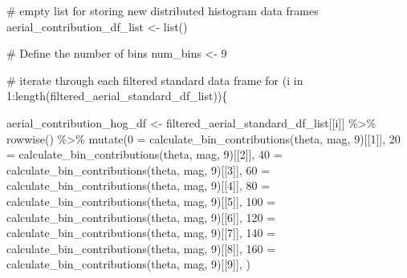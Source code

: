 \documentclass[
  letterpaper,
  DIV=11,
  numbers=noendperiod]{scrreprt}
\newenvironment{Shaded}{\begin{snugshade}}{\end{snugshade}}
\newcommand{\AttributeTok}[1]{\textcolor[rgb]{0.40,0.45,0.13}{#1}}
\newcommand{\CommentTok}[1]{\textcolor[rgb]{0.37,0.37,0.37}{#1}}
\newcommand{\ControlFlowTok}[1]{\textcolor[rgb]{0.00,0.23,0.31}{#1}}
\newcommand{\DecValTok}[1]{\textcolor[rgb]{0.68,0.00,0.00}{#1}}
\newcommand{\FunctionTok}[1]{\textcolor[rgb]{0.28,0.35,0.67}{#1}}
\newcommand{\NormalTok}[1]{\textcolor[rgb]{0.00,0.23,0.31}{#1}}
\newcommand{\OtherTok}[1]{\textcolor[rgb]{0.00,0.23,0.31}{#1}}
\newcommand{\SpecialCharTok}[1]{\textcolor[rgb]{0.37,0.37,0.37}{#1}}
\newcommand{\StringTok}[1]{\textcolor[rgb]{0.13,0.47,0.30}{#1}}
\begin{document}
\begin{Shaded}
\begin{Highlighting}[]
\CommentTok{\# empty list for storing new distributed histogram data frames}
\NormalTok{aerial\_contribution\_df\_list }\OtherTok{\textless{}{-}} \FunctionTok{list}\NormalTok{()}

\CommentTok{\# Define the number of bins}
\NormalTok{num\_bins }\OtherTok{\textless{}{-}} \DecValTok{9}
 
\CommentTok{\# iterate through each filtered standard data frame}
\ControlFlowTok{for}\NormalTok{ (i }\ControlFlowTok{in} \DecValTok{1}\SpecialCharTok{:}\FunctionTok{length}\NormalTok{(filtered\_aerial\_standard\_df\_list))\{}
  
\NormalTok{  aerial\_contribution\_hog\_df }\OtherTok{\textless{}{-}} 
\NormalTok{    filtered\_aerial\_standard\_df\_list[[i]] }\SpecialCharTok{\%\textgreater{}\%}
    \FunctionTok{rowwise}\NormalTok{() }\SpecialCharTok{\%\textgreater{}\%}
    \FunctionTok{mutate}\NormalTok{(}\StringTok{\textasciigrave{}}\AttributeTok{0}\StringTok{\textasciigrave{}} \OtherTok{=} \FunctionTok{calculate\_bin\_contributions}\NormalTok{(theta, mag, }\DecValTok{9}\NormalTok{)[[}\DecValTok{1}\NormalTok{]],}
           \StringTok{\textasciigrave{}}\AttributeTok{20}\StringTok{\textasciigrave{}} \OtherTok{=} \FunctionTok{calculate\_bin\_contributions}\NormalTok{(theta, mag, }\DecValTok{9}\NormalTok{)[[}\DecValTok{2}\NormalTok{]],}
           \StringTok{\textasciigrave{}}\AttributeTok{40}\StringTok{\textasciigrave{}} \OtherTok{=} \FunctionTok{calculate\_bin\_contributions}\NormalTok{(theta, mag, }\DecValTok{9}\NormalTok{)[[}\DecValTok{3}\NormalTok{]],}
           \StringTok{\textasciigrave{}}\AttributeTok{60}\StringTok{\textasciigrave{}} \OtherTok{=} \FunctionTok{calculate\_bin\_contributions}\NormalTok{(theta, mag, }\DecValTok{9}\NormalTok{)[[}\DecValTok{4}\NormalTok{]],}
           \StringTok{\textasciigrave{}}\AttributeTok{80}\StringTok{\textasciigrave{}} \OtherTok{=} \FunctionTok{calculate\_bin\_contributions}\NormalTok{(theta, mag, }\DecValTok{9}\NormalTok{)[[}\DecValTok{5}\NormalTok{]],}
           \StringTok{\textasciigrave{}}\AttributeTok{100}\StringTok{\textasciigrave{}} \OtherTok{=} \FunctionTok{calculate\_bin\_contributions}\NormalTok{(theta, mag, }\DecValTok{9}\NormalTok{)[[}\DecValTok{6}\NormalTok{]],}
           \StringTok{\textasciigrave{}}\AttributeTok{120}\StringTok{\textasciigrave{}} \OtherTok{=} \FunctionTok{calculate\_bin\_contributions}\NormalTok{(theta, mag, }\DecValTok{9}\NormalTok{)[[}\DecValTok{7}\NormalTok{]],}
           \StringTok{\textasciigrave{}}\AttributeTok{140}\StringTok{\textasciigrave{}} \OtherTok{=} \FunctionTok{calculate\_bin\_contributions}\NormalTok{(theta, mag, }\DecValTok{9}\NormalTok{)[[}\DecValTok{8}\NormalTok{]],}
           \StringTok{\textasciigrave{}}\AttributeTok{160}\StringTok{\textasciigrave{}} \OtherTok{=} \FunctionTok{calculate\_bin\_contributions}\NormalTok{(theta, mag, }\DecValTok{9}\NormalTok{)[[}\DecValTok{9}\NormalTok{]],}
\NormalTok{           )}
  

\end{Highlighting}
\end{Shaded}
\end{document}
